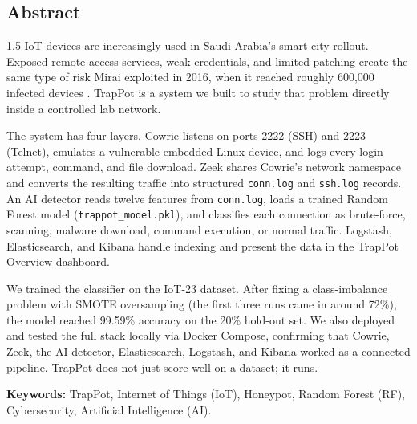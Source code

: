 \begin{center}
\section*{Abstract}
\end{center}


\begin{spacing}{1.5}
IoT devices are increasingly used in Saudi Arabia's smart-city rollout. Exposed remote-access services, weak credentials, and limited patching create the same type of risk Mirai exploited in 2016, when it reached roughly 600,000 infected devices \cite{203628}. TrapPot is a system we built to study that problem directly inside a controlled lab network.

The system has four layers. Cowrie listens on ports 2222 (SSH) and 2223 (Telnet), emulates a vulnerable embedded Linux device, and logs every login attempt, command, and file download. Zeek shares Cowrie's network namespace and converts the resulting traffic into structured \texttt{conn.log} and \texttt{ssh.log} records. An AI detector reads twelve features from \texttt{conn.log}, loads a trained Random Forest model (\texttt{trappot\_model.pkl}), and classifies each connection as brute-force, scanning, malware download, command execution, or normal traffic. Logstash, Elasticsearch, and Kibana handle indexing and present the data in the TrapPot Overview dashboard.

We trained the classifier on the IoT-23 dataset. After fixing a class-imbalance problem with SMOTE oversampling (the first three runs came in around 72\%), the model reached 99.59\% accuracy on the 20\% hold-out set. We also deployed and tested the full stack locally via Docker Compose, confirming that Cowrie, Zeek, the AI detector, Elasticsearch, Logstash, and Kibana worked as a connected pipeline. TrapPot does not just score well on a dataset; it runs.

{\bf Keywords:} TrapPot, Internet of Things (IoT), Honeypot, Random Forest (RF), Cybersecurity, Artificial Intelligence (AI).
\end{spacing}
\clearpage
